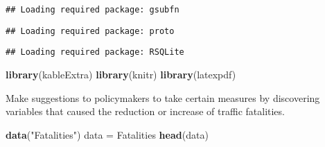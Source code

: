 \documentclass[]{article}
\newenvironment{Shaded}{\begin{snugshade}}{\end{snugshade}}
\newcommand{\KeywordTok}[1]{\textcolor[rgb]{0.13,0.29,0.53}{\textbf{#1}}}
\newcommand{\NormalTok}[1]{#1}
\newcommand{\StringTok}[1]{\textcolor[rgb]{0.31,0.60,0.02}{#1}}
\begin{document}
\begin{verbatim}
## Loading required package: gsubfn
\end{verbatim}

\begin{verbatim}
## Loading required package: proto
\end{verbatim}

\begin{verbatim}
## Loading required package: RSQLite
\end{verbatim}

\begin{Shaded}
\begin{Highlighting}[]
\KeywordTok{library}\NormalTok{(kableExtra)}
\KeywordTok{library}\NormalTok{(knitr)}
\KeywordTok{library}\NormalTok{(latexpdf)}
\end{Highlighting}
\end{Shaded}

Make suggestions to policymakers to take certain measures by discovering variables that caused the reduction or increase of traffic fatalities.

\begin{Shaded}
\begin{Highlighting}[]
\KeywordTok{data}\NormalTok{(}\StringTok{"Fatalities"}\NormalTok{)}
\NormalTok{data =}\StringTok{ }\NormalTok{Fatalities}
\KeywordTok{head}\NormalTok{(data)}
\end{Highlighting}
\end{Shaded}
\end{document}
